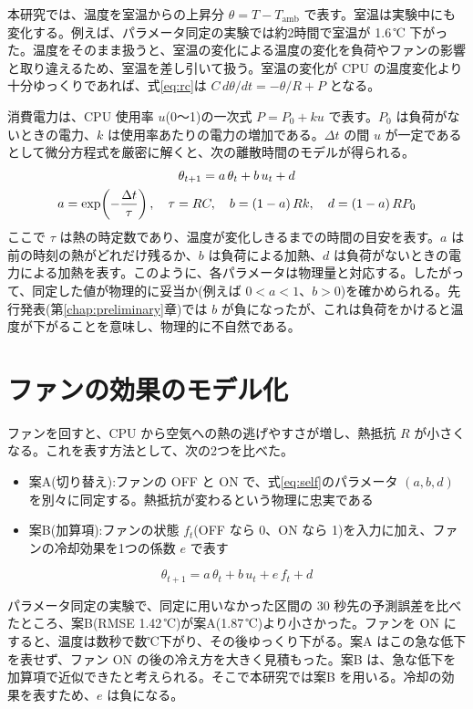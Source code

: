 本研究では、温度を室温からの上昇分 $\theta = T - T_{\mathrm{amb}}$ で表す。室温は実験中にも変化する。例えば、パラメータ同定の実験では約2時間で室温が 1.6\,℃ 下がった。温度をそのまま扱うと、室温の変化による温度の変化を負荷やファンの影響と取り違えるため、室温を差し引いて扱う。室温の変化が CPU の温度変化より十分ゆっくりであれば、式\eqref{eq:rc}は $C\,d\theta/dt = -\theta/R + P$ となる。

消費電力は、CPU 使用率 $u$(0〜1)の一次式 $P = P_0 + k u$ で表す。$P_0$ は負荷がないときの電力、$k$ は使用率あたりの電力の増加である。$\Delta t$ の間 $u$ が一定であるとして微分方程式を厳密に解くと、次の離散時間のモデルが得られる。
\begin{gather}
  \theta_{t+1} = a\,\theta_t + b\,u_t + d \label{eq:self}\\
  a = \exp\!\left(-\frac{\Delta t}{\tau}\right),\quad \tau = RC,\quad
  b = (1-a)\,R k,\quad d = (1-a)\,R P_0 \notag
\end{gather}
ここで $\tau$ は熱の時定数であり、温度が変化しきるまでの時間の目安を表す。$a$ は前の時刻の熱がどれだけ残るか、$b$ は負荷による加熱、$d$ は負荷がないときの電力による加熱を表す。このように、各パラメータは物理量と対応する。したがって、同定した値が物理的に妥当か(例えば $0 < a < 1$、$b > 0$)を確かめられる。先行発表(第\ref{chap:preliminary}章)では $b$ が負になったが、これは負荷をかけると温度が下がることを意味し、物理的に不自然である。

\section{ファンの効果のモデル化}\label{sec:method-fan}
ファンを回すと、CPU から空気への熱の逃げやすさが増し、熱抵抗 $R$ が小さくなる。これを表す方法として、次の2つを比べた。
\begin{itemize}
  \item 案A(切り替え):ファンの OFF と ON で、式\eqref{eq:self}のパラメータ $(a, b, d)$ を別々に同定する。熱抵抗が変わるという物理に忠実である
  \item 案B(加算項):ファンの状態 $f_t$(OFF なら 0、ON なら 1)を入力に加え、ファンの冷却効果を1つの係数 $e$ で表す
\end{itemize}
\begin{equation}
  \theta_{t+1} = a\,\theta_t + b\,u_t + e\,f_t + d
  \label{eq:self-fan}
\end{equation}

パラメータ同定の実験で、同定に用いなかった区間の 30 秒先の予測誤差を比べたところ、案B(RMSE 1.42\,℃)が案A(1.87\,℃)より小さかった。ファンを ON にすると、温度は数秒で数℃下がり、その後ゆっくり下がる。案A はこの急な低下を表せず、ファン ON の後の冷え方を大きく見積もった。案B は、急な低下を加算項で近似できたと考えられる。そこで本研究では案B を用いる。冷却の効果を表すため、$e$ は負になる。

